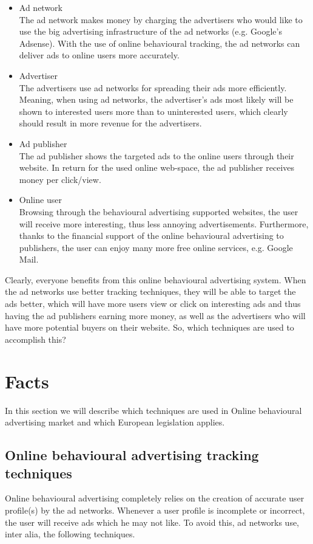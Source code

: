 \documentclass[11pt]{article}
\newcommand{\OBA}{Online behavioural advertising }
\newcommand{\oba}{online behavioural advertising }
\begin{document}
\begin{itemize}
	\item Ad network\\
			The ad network makes money by charging the advertisers who would like to use the big advertising infrastructure of the ad networks (e.g. Google's Adsense). With the use of online behavioural tracking, the ad networks can deliver ads to online users more accurately.

	\item Advertiser\\
			The advertisers use ad networks for spreading their ads more efficiently. Meaning, when using ad networks, the advertiser's ads most likely will be shown to interested users more than to uninterested users, which clearly should result in more revenue for the advertisers.

	\item Ad publisher\\
			The ad publisher shows the targeted ads to the online users through their website. In return for the used online web-space, the ad publisher receives money per click/view.

	\item Online user\\
			Browsing through the behavioural advertising supported websites, the user will receive more interesting, thus less annoying advertisements. Furthermore, thanks to the financial support of the \oba to publishers, the user can enjoy many more free online services, e.g. Google Mail. 
\end{itemize}

Clearly, everyone benefits from this \oba system.
When the ad networks use better tracking techniques, they will be able to target the ads better, which will have more users view or click on interesting ads and thus having the ad publishers earning more money, as well as the advertisers who will have more potential buyers on their website.
So, which techniques are used to accomplish this?

\section{Facts}
In this section we will describe which techniques are used in \OBA market and which European legislation applies.

\subsection{\OBA tracking techniques}
\label{techniques}
Online behavioural advertising completely relies on the creation of accurate user profile(s) by the ad networks. Whenever a user profile is incomplete or incorrect, the user will receive ads which he may not like. To avoid this, ad networks use, inter alia, the following techniques.
\end{document}
